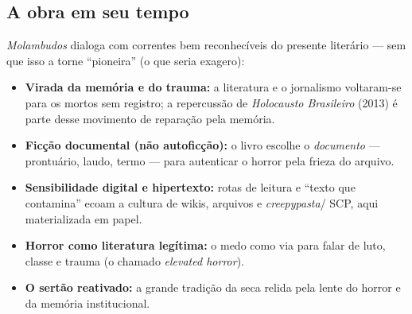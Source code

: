 \subsection*{A obra em seu tempo}
\textit{Molambudos} dialoga com correntes bem reconhecíveis do presente
literário --- sem que isso a torne ``pioneira'' (o que seria exagero):
\begin{itemize}
\item \textbf{Virada da memória e do trauma:} a literatura e o jornalismo
voltaram-se para os mortos sem registro; a repercussão de \textit{Holocausto
Brasileiro} (2013) é parte desse movimento de reparação pela memória.
\item \textbf{Ficção documental (não autoficção):} o livro escolhe o
\emph{documento} --- prontuário, laudo, termo --- para autenticar o horror
pela frieza do arquivo.
\item \textbf{Sensibilidade digital e hipertexto:} rotas de leitura e ``texto
que contamina'' ecoam a cultura de wikis, arquivos e \emph{creepypasta}\slash
SCP, aqui materializada em papel.
\item \textbf{Horror como literatura legítima:} o medo como via para falar de
luto, classe e trauma (o chamado \emph{elevated horror}).
\item \textbf{O sertão reativado:} a grande tradição da seca relida pela lente
do horror e da memória institucional.
\end{itemize}

